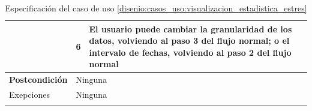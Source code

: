 \begin{table}[h]
\begin{tabularx}{\textwidth}{|l|l|X|}
                    \cline{2-3} & 6 & El usuario puede cambiar la granularidad de los datos, volviendo al paso 3 del flujo normal; o el intervalo de fechas, volviendo al paso 2 del flujo normal \\
                    \hline
                    \textbf{Postcondición} & \multicolumn{2}{|X|}{Ninguna} \\
                    \hline
                    Exepciones & \multicolumn{2}{|X|}{Ninguna} \\
                    \hline
                    \caption{Especificación del caso de uso \ref{disenio:casos_uso:visualizacion_estadistica_estres}}
                    \label{tabla:casos_uso:visualizacion_estadistica_estres}
                \end{tabularx}
            \end{table}

